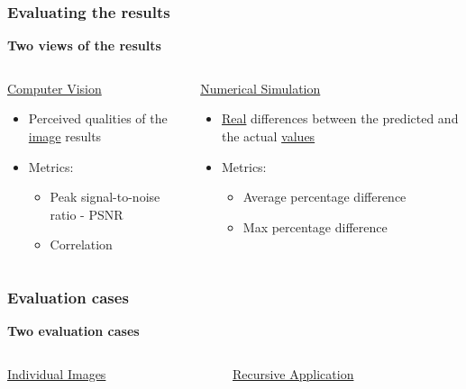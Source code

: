 \documentclass[18pt]{beamer}
\begin{document}
\begin{frame}[t]
  \frametitle{Evaluating the results}
  \begin{center}
    \textbf{\Large Two views of the results}
  \end{center}
  \begin{columns}[t]
    \begin{column}{0.5\textwidth}
      \begin{center}
        {\large \underline{Computer Vision}}
        \begin{itemize}
        \item Perceived qualities of the \underline{image} results
        \item Metrics:
          \begin{itemize}
          \item Peak signal-to-noise ratio - PSNR
          \item Correlation
          \end{itemize}
        \end{itemize}
      \end{center}
    \end{column}
    \begin{column}{0.5\textwidth}
      \begin{center}
        {\large \underline{Numerical Simulation}}
        \begin{itemize}
        \item \underline{Real} differences between the predicted and the actual \underline{values}
        \item Metrics:
          \begin{itemize}
            \item Average percentage difference
            \item Max percentage difference
          \end{itemize}
        \end{itemize}
      \end{center}  
    \end{column}
  \end{columns}
\end{frame}


\begin{frame}[t]
  \frametitle{Evaluation cases}
  \begin{center}
    \textbf{\Large Two evaluation cases}
  \end{center}
  \vspace{-1cm}
  \begin{columns}[t]
    \begin{column}{0.5\textwidth}
      \begin{center}
        {\large \underline{Individual Images}}
      \end{center}
    \end{column}
    \begin{column}{0.5\textwidth}
      \begin{center}
        {\large \underline{Recursive Application}}
        \end{center}
    \end{column}
  \end{columns}
\end{frame}
\end{document}
